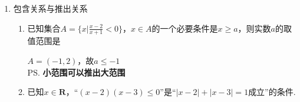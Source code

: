\begin{enumerate}
\begin{enumerate}
\begin{jieda}
        \end{jieda}
        \item 对任意实数$x$，不等式$2kx^2+kx-3<0$恒成立，则实数$k$的取值范围是\blkda{$(-24, 0]$}
        \begin{jieda}
            当$k=0$时，不等式成立。\\
            当$k \neq 0$，从二次函数的角度看一元二次不等式，要使得不等式恒成立，则应有函数开口向下，即$k<0$，并且有$\Delta = k^2 + 24k < 0$，因此$k \in (-24, 0)$。\\
            综上，$k \in (-24, 0]$
        \end{jieda}
        \item 已知集合$A = \{(x, y) | \frac{y-3}{x-2} = a+1\}, B = \{(x, y) | (a^2-1)x+(a-1)y = 15\}$，若$A \cap B = \varnothing$，则的取值范围是
        \begin{jieda}
            $A = \{(x, y) | y = 3 + (a+1)(x-2), x \neq 2 \} \\
            B = \{(x, y) | y = -(a+1)x + \frac{15}{a-1}\} (a \neq 1), \quad B = \varnothing(a = 1)$ \\
            易知当$a = 1$时符合条件 \\
            当$a \neq 1$时，由于$A$是一条直线刨除了点$(2,3)$，$B$是另一条直线，所以有两种可能满足题意。
            \begin{enumerate}
                \item 两直线平行，此时$a = -1$，满足题意
                \item $B$对应直线过$(2, 3)$，此时$a = -4 \mbox{或} \frac{5}{2}$，均满足题意
            \end{enumerate}
        \end{jieda}
    \end{enumerate}
    \item 包含关系与推出关系
    \begin{enumerate}
        \item 已知集合$A = \{x | \frac{x-2}{x+1} < 0\}$，$x \in A$的一个必要条件是$x \geq a$，则实数$a$的取值范围是
        \begin{jieda}
            $A = (-1, 2)$，故$a \leq -1$ \\
            \ps \textbf{小范围可以推出大范围}
        \end{jieda}
        \item 已知$x \in \mathbf{R}$，“$(x-2)(x-3) \leq 0$”是“$|x-2|+|x-3| = 1$成立”的条件.
        \begin{jieda}

\end{jieda}
\end{enumerate}
\end{enumerate}
